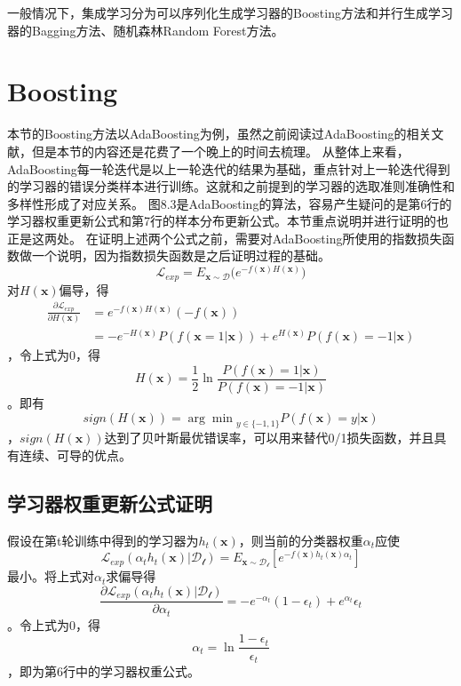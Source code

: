 一般情况下，集成学习分为可以序列化生成学习器的Boosting方法和并行生成学习器的Bagging方法、随机森林Random Forest方法。

\section{Boosting}

本节的Boosting方法以AdaBoosting为例，虽然之前阅读过AdaBoosting的相关文献，但是本节的内容还是花费了一个晚上的时间去梳理。
从整体上来看，AdaBoosting每一轮迭代是以上一轮迭代的结果为基础，重点针对上一轮迭代得到的学习器的错误分类样本进行训练。这就和之前提到的学习器的选取准则准确性和多样性形成了对应关系。
图8.3是AdaBoosting的算法，容易产生疑问的是第6行的学习器权重更新公式和第7行的样本分布更新公式。本节重点说明并进行证明的也正是这两处。
在证明上述两个公式之前，需要对AdaBoosting所使用的指数损失函数做一个说明，因为指数损失函数是之后证明过程的基础。
\begin{equation}
\mathcal{L}_{exp}=E_{\mathbf{x}\sim\mathcal{D}}\Big(e^{-f(\mathbf{x})H(\mathbf{x})}\Big)
\end{equation}
对$H(\mathbf{x})$偏导，得
\begin{equation}\begin{split}
\frac{\partial\mathcal{L}_{exp}}{\partial H(\mathbf{x})}&=e^{-f(\mathbf{x})H(\mathbf{x})}(-f(\mathbf{x}))\\
&=-e^{-H(\mathbf{x})}P(f(\mathbf{x}=1|\mathbf{x}))+e^{H(\mathbf{x})}P(f(\mathbf{x})=-1|\mathbf{x})
\end{split}\end{equation}
，令上式为0，得
\begin{equation}
H(\mathbf{x})=\frac{1}{2}\ln\frac{P(f(\mathbf{x})=1|\mathbf{x})}{P(f(\mathbf{x})=-1|\mathbf{x})}
\end{equation}
。即有
\begin{equation}
sign(H(\mathbf{x}))={\arg\min}_{y\in\{-1,1\}}P(f(\mathbf{x})=y|\mathbf{x})
\end{equation}
，$sign(H(\mathbf{x}))$达到了贝叶斯最优错误率，可以用来替代0/1损失函数，并且具有连续、可导的优点。

\subsection*{学习器权重更新公式证明}

假设在第t轮训练中得到的学习器为$h_t(\mathbf{x})$，则当前的分类器权重$\alpha_t$应使
\begin{equation}
\mathcal{L}_{exp}(\alpha_th_t(\mathbf{x})|\mathcal{D_t})=E_{\mathbf{x}\sim\mathcal{D_t}}[e^{-f(\mathbf{x})h_t(\mathbf{x})\alpha_t}]
\end{equation}
最小。将上式对$\alpha_t$求偏导得
\begin{equation}
\frac{\partial \mathcal{L}_{exp}(\alpha_th_t(\mathbf{x})|\mathcal{D_t})}{\partial \alpha_t}=-e^{-\alpha_t}(1-\epsilon_t)+e^{\alpha_t}\epsilon_t
\end{equation}
。令上式为$0$，得
\begin{equation}
\alpha_t=\ln\frac{1-\epsilon_t}{\epsilon_t}
\end{equation}
，即为第6行中的学习器权重公式。

